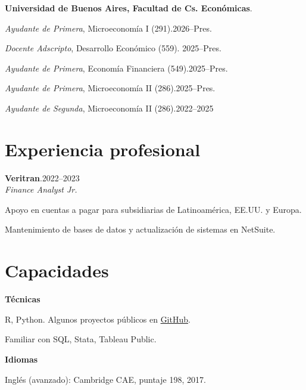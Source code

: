 \documentclass[11pt]{article}
\newcommand{\entrydate}[1]{\hfill{\small{#1}}}
\begin{document}
\textbf{Universidad de Buenos Aires, Facultad de Cs. Económicas}.
\begin{cvitems}
  \item \textit{Ayudante de Primera}, Microeconomía I (291).\entrydate{2026--Pres.}
  \item \textit{Docente Adscripto}, Desarrollo Económico (559). \entrydate{2025--Pres.}
  \item \textit{Ayudante de Primera}, Economía Financiera (549).\entrydate{2025--Pres.}
  \item \textit{Ayudante de Primera}, Microeconomía II (286).\entrydate{2025--Pres.}
  \item \textit{Ayudante de Segunda}, Microeconomía II (286).\entrydate{2022--2025}
  \end{cvitems}

\section{Experiencia profesional}
\textbf{Veritran}.\entrydate{2022--2023}\\
\textit{Finance Analyst Jr.}
\begin{cvitems}
  \item Apoyo en cuentas a pagar para subsidiarias de Latinoamérica, EE.UU. y Europa.
  \item Mantenimiento de bases de datos y actualización de sistemas en NetSuite.
\end{cvitems}

\section{Capacidades}
\textbf{Técnicas}
\begin{cvitems}
  \item R, Python. Algunos proyectos públicos en \href{www.github.com/sanarovaz/}{GitHub}. 
  \item Familiar con SQL, Stata, Tableau Public.
\end{cvitems}
\textbf{Idiomas}
\begin{cvitems}
\item Inglés (avanzado): Cambridge CAE, puntaje 198, 2017.
\end{cvitems}


\end{document}
